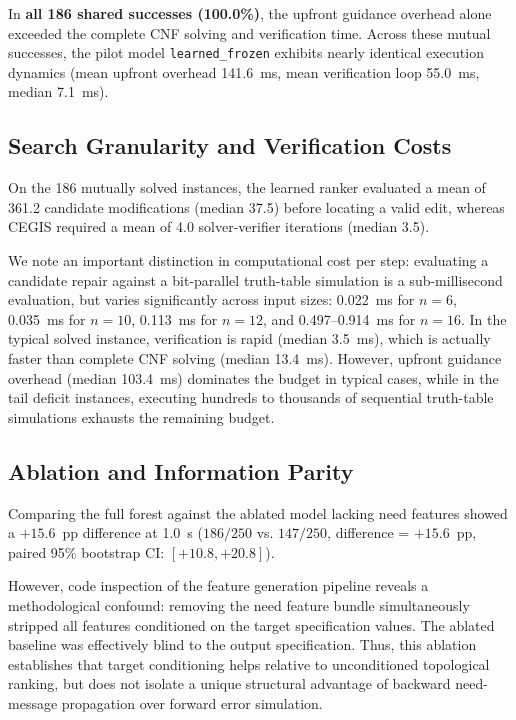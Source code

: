\documentclass[11pt,a4paper]{article}
\begin{document}
In \textbf{all 186 shared successes (100.0\%)}, the upfront guidance overhead alone exceeded the complete CNF solving and verification time. Across these mutual successes, the pilot model \texttt{learned\_frozen} exhibits nearly identical execution dynamics (mean upfront overhead 141.6~ms, mean verification loop 55.0~ms, median 7.1~ms).

\subsection{Search Granularity and Verification Costs}
On the 186 mutually solved instances, the learned ranker evaluated a mean of 361.2 candidate modifications (median 37.5) before locating a valid edit, whereas CEGIS required a mean of 4.0 solver-verifier iterations (median 3.5). 

We note an important distinction in computational cost per step: evaluating a candidate repair against a bit-parallel truth-table simulation is a sub-millisecond evaluation, but varies significantly across input sizes: 0.022~ms for $n=6$, 0.035~ms for $n=10$, 0.113~ms for $n=12$, and 0.497--0.914~ms for $n=16$. In the typical solved instance, verification is rapid (median 3.5~ms), which is actually faster than complete CNF solving (median 13.4~ms). However, upfront guidance overhead (median 103.4~ms) dominates the budget in typical cases, while in the tail deficit instances, executing hundreds to thousands of sequential truth-table simulations exhausts the remaining budget.

\subsection{Ablation and Information Parity}
Comparing the full forest against the ablated model lacking need features showed a $+15.6$~pp difference at 1.0~s ($186/250$ vs. $147/250$, difference = $+15.6$~pp, paired 95\% bootstrap CI: $[+10.8, +20.8]$). 

However, code inspection of the feature generation pipeline reveals a methodological confound: removing the need feature bundle simultaneously stripped all features conditioned on the target specification values. The ablated baseline was effectively blind to the output specification. Thus, this ablation establishes that target conditioning helps relative to unconditioned topological ranking, but does not isolate a unique structural advantage of backward need-message propagation over forward error simulation.
\end{document}
